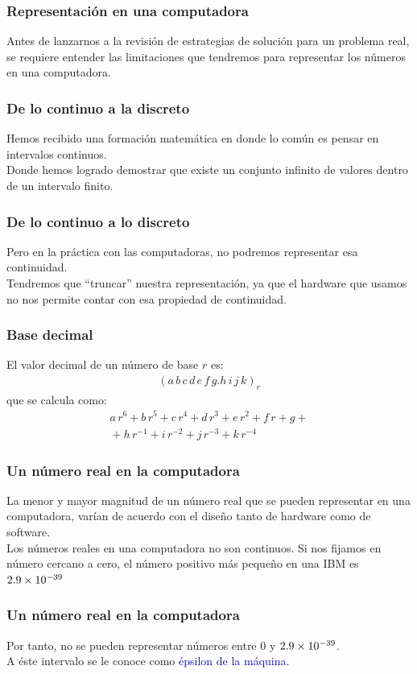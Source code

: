 \documentclass[12pt]{beamer}
\begin{document}
\begin{frame}
\frametitle{Representación en una computadora}
Antes de lanzarnos a la revisión de estrategias de solución para un problema real, se requiere entender las limitaciones que tendremos para representar los números en una computadora.
\end{frame}
\begin{frame}
\frametitle{De lo continuo a la discreto}
Hemos recibido una formación matemática en donde lo común es pensar en intervalos continuos.
\\
\bigskip
\pause
Donde hemos logrado demostrar que existe un conjunto infinito de valores dentro de un intervalo finito.
\end{frame}
\begin{frame}
\frametitle{De lo continuo a lo discreto}
Pero en la práctica con las computadoras, no podremos representar esa continuidad.
\\
\bigskip
\pause
Tendremos que \enquote{truncar} nuestra representación, ya que el hardware que usamos no nos permite contar con esa propiedad de continuidad.
\end{frame}
\begin{frame}
\frametitle{Base decimal}
El valor decimal de un número de base $r$ es:
\begin{align*}
(a \, b \, c \, d \, e \, f \, g.h \, i \, j \, k)_{r}
\end{align*}
\pause
que se calcula como:
\pause
\begin{align*}
a \, r^{6} + b \, r^{5} + c \, r^{4} + d \, r^{3} + e \, r^{2} + f \, r + g + {} \\
{} + h \, r^{-1} + i \, r^{-2} + j \, r^{-3} + k \, r^{-4}
\end{align*}
\end{frame}
\begin{frame}
\frametitle{Un número real en la computadora}
La menor y mayor magnitud de un número real que se pueden representar en una computadora, varían de acuerdo con el diseño tanto de hardware como de software.
\\
\bigskip
\pause
Los números reales en una computadora no son continuos. \pause Si nos fijamos en número cercano a cero, el número positivo más pequeño en una IBM es $\num{2.9d-39}$
\end{frame}
\begin{frame}
\frametitle{Un número real en la computadora}
Por tanto, no se pueden representar números entre $0$ y $\num{2.9d-39}$.
\\
\bigskip
\pause
A éste intervalo se le conoce como \textcolor{blue}{épsilon de la máquina}.
\end{frame}
\end{document}
